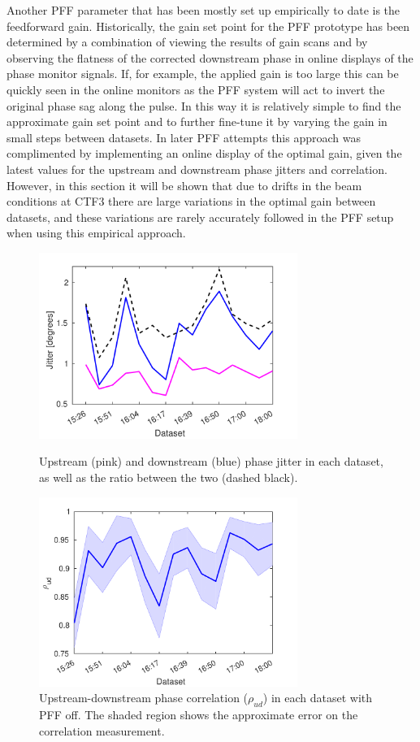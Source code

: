 Another PFF parameter that has been mostly set up empirically to date is the feedforward gain. Historically, the gain set point for the PFF prototype has been determined by a combination of viewing the results of gain scans %
and by observing the flatness of the corrected downstream phase in online displays of the phase monitor signals. If, for example, the applied gain is too large this can be quickly seen in the online monitors as the PFF system will act to invert the original phase sag along the pulse. In this way it is relatively simple to find the approximate gain set point and to further fine-tune it by varying the gain in small steps between datasets. In later PFF attempts this approach was complimented by implementing an online display of the optimal gain, given the latest values for the upstream and downstream phase jitters and correlation. However, in this section it will be shown that due to drifts in the beam conditions at CTF3 there are large variations in the optimal gain between datasets, and these variations are rarely accurately followed in the PFF setup when using this empirical approach.


\begin{figure}
  \centering
  \includegraphics[width=0.75\textwidth]{Figures/feedforward/longFF_jitDatSetFFOff}
  \caption{Upstream (pink) and downstream (blue) phase jitter in each dataset, as well as the ratio between the two (dashed black).}
  \label{f:longFF_jitFFOff}

  \includegraphics[width=0.75\textwidth]{Figures/feedforward/longFF_corrFFOff}
  \caption{Upstream-downstream phase correlation (\(\rho_{ud}\)) in each dataset with PFF off. The shaded region shows the approximate error on the correlation measurement.}
  \label{f:longFF_corrFFOff}
\end{figure}

